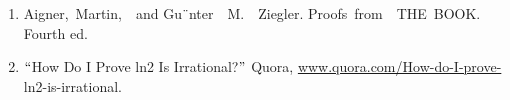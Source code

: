 \documentclass[12pt]{article}
\begin{document}
\vspace{\baselineskip}

\vspace{\baselineskip}

\vspace{\baselineskip}

\vspace{\baselineskip}

\vspace{\baselineskip}

\vspace{\baselineskip}

\vspace{\baselineskip}
\par

\begin{enumerate}
	\item Aigner,\  Martin,\ \ and  Gu¨nter\ \ M.\ \ Ziegler.   Proofs\  from\ \ THE\  BOOK.  Fourth ed.\par

	\item $``$How Do I Prove ln2 Is Irrational?$"$  Quora, \href{http://www.quora.com/How-do-I-prove-}{www.quora.com/How-do-I-prove-} ln2-is-irrational.
\end{enumerate}\par


\printbibliography
\end{document}
